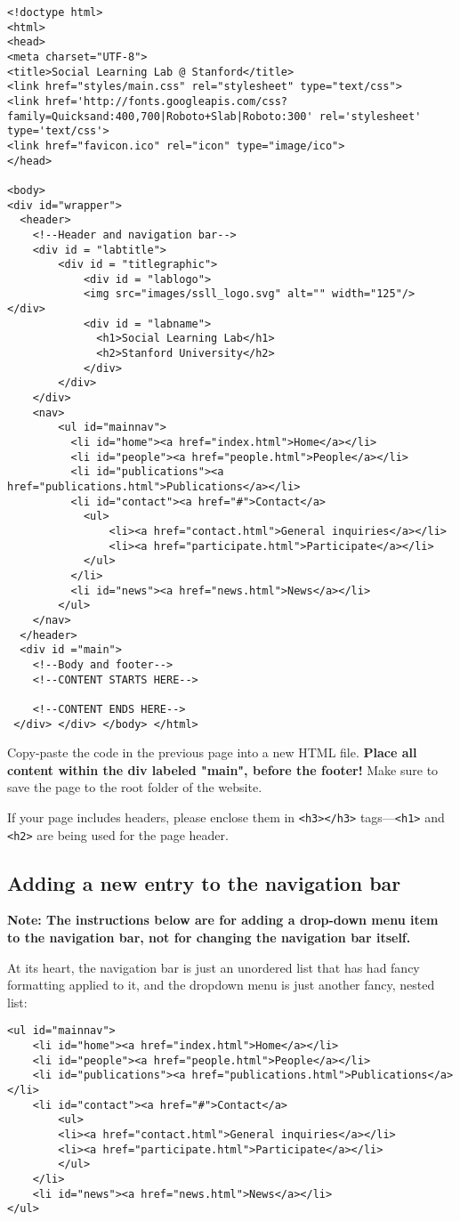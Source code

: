 \documentclass{article}
\begin{document}
\begin{lstlisting}
<!doctype html>
<html>
<head>
<meta charset="UTF-8">
<title>Social Learning Lab @ Stanford</title>
<link href="styles/main.css" rel="stylesheet" type="text/css">
<link href='http://fonts.googleapis.com/css?family=Quicksand:400,700|Roboto+Slab|Roboto:300' rel='stylesheet' type='text/css'>
<link href="favicon.ico" rel="icon" type="image/ico">
</head>

<body>
<div id="wrapper">
  <header>
  	<!--Header and navigation bar-->
    <div id = "labtitle">
    	<div id = "titlegraphic">
            <div id = "lablogo">
            <img src="images/ssll_logo.svg" alt="" width="125"/> </div>
            <div id = "labname">
              <h1>Social Learning Lab</h1>
              <h2>Stanford University</h2>
            </div>
        </div>
    </div>
  	<nav>
    	<ul id="mainnav">
    	  <li id="home"><a href="index.html">Home</a></li>
    	  <li id="people"><a href="people.html">People</a></li>
    	  <li id="publications"><a href="publications.html">Publications</a></li>
    	  <li id="contact"><a href="#">Contact</a>
         	<ul>
            	<li><a href="contact.html">General inquiries</a></li>
                <li><a href="participate.html">Participate</a></li>
            </ul>
          </li>
    	  <li id="news"><a href="news.html">News</a></li>
    	</ul>
    </nav>
  </header>
  <div id ="main">
  	<!--Body and footer-->
    <!--CONTENT STARTS HERE-->

    <!--CONTENT ENDS HERE-->
 </div> </div> </body> </html>
\end{lstlisting}

\pagebreak

Copy-paste the code in the previous page into a new HTML file. \textbf{Place all content within the div labeled "main", before the footer!} Make sure to save the page to the root folder of the website.

If your page includes headers, please enclose them in \lstinline{<h3></h3>} tags---\lstinline{<h1>} and \lstinline{<h2>} are being used for the page header.

\subsection{Adding a new entry to the navigation bar}
\textbf{Note: The instructions below are for adding a drop-down menu item to the navigation bar, not for changing the navigation bar itself.}

At its heart, the navigation bar is just an unordered list that has had fancy formatting applied to it, and the dropdown menu is just another fancy, nested list:
\begin{lstlisting}
<ul id="mainnav">
 	<li id="home"><a href="index.html">Home</a></li>
	<li id="people"><a href="people.html">People</a></li>
	<li id="publications"><a href="publications.html">Publications</a></li>
	<li id="contact"><a href="#">Contact</a>
		<ul>
		<li><a href="contact.html">General inquiries</a></li>
		<li><a href="participate.html">Participate</a></li>
		</ul>
	</li>
	<li id="news"><a href="news.html">News</a></li>
</ul>
\end{lstlisting}
\end{document}
